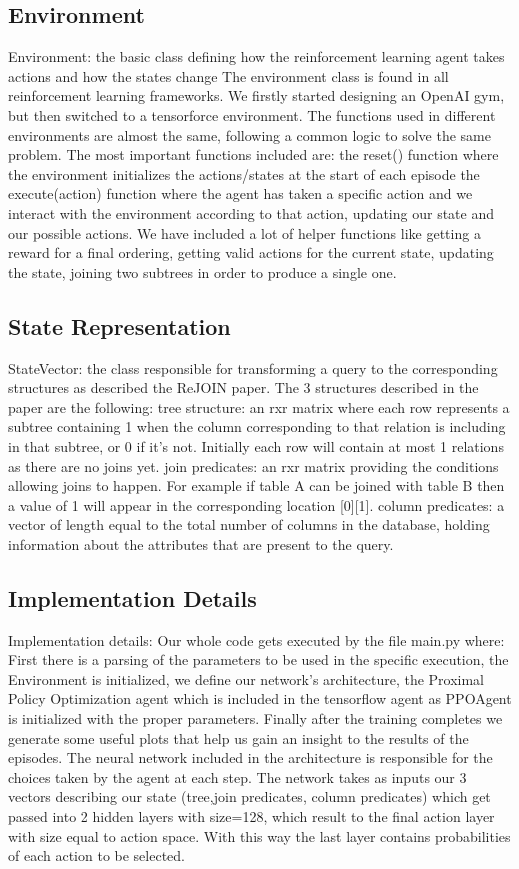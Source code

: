 \documentclass[sigconf,10pt,preprint]{acmart}
\begin{document}
\subsection{Environment}
Environment: the basic class defining how the reinforcement learning agent takes actions and how the states change
The environment class is found in all reinforcement learning frameworks. We firstly started designing an OpenAI gym, but then switched to a tensorforce environment. The functions used in different environments are almost the same, following a common logic to solve the same problem. The most important functions included are:
the reset() function where the environment initializes the actions/states at the start of each episode
the execute(action) function where the agent has taken a specific action and we interact with the environment according to that action, updating our state and our possible actions.
We have included a lot of helper functions like getting a reward for a final ordering, getting valid actions for the current state, updating the state, joining two subtrees in order to produce a single one.

\subsection{State Representation}
StateVector: the class responsible for transforming a query to the corresponding structures as described the ReJOIN paper.
The 3 structures described in the paper are the following:
tree structure: an rxr matrix where each row represents a subtree containing 1 when the column corresponding to that relation is including in that subtree, or 0 if it’s not. Initially each row will contain at most 1 relations as there are no joins yet. 
join predicates: an rxr matrix providing the conditions allowing joins to happen. For example if table A can be joined with table B then a value of 1 will appear in the corresponding location [0][1].
column predicates: a vector of length equal to the total number of columns in the database, holding information about the attributes that are present to the query.

\subsection{Implementation Details}
Implementation details:
Our whole code gets executed by the file main.py where:
First there is a parsing of the parameters to be used in the specific execution,
the Environment is initialized,
we define our network’s architecture,
the Proximal Policy Optimization agent which is included in the tensorflow agent as PPOAgent is initialized with the proper parameters.
Finally after the training completes we generate some useful plots that help us gain an insight to the results of the episodes.
The neural network included in the architecture is responsible for the choices taken by the agent at each step. The network takes as inputs our 3 vectors describing our state (tree,join predicates, column predicates) which get passed into 2 hidden layers with size=128, which result to the final action layer with size equal to action space. With this way the last layer contains probabilities of each action to be selected.
\end{document}
